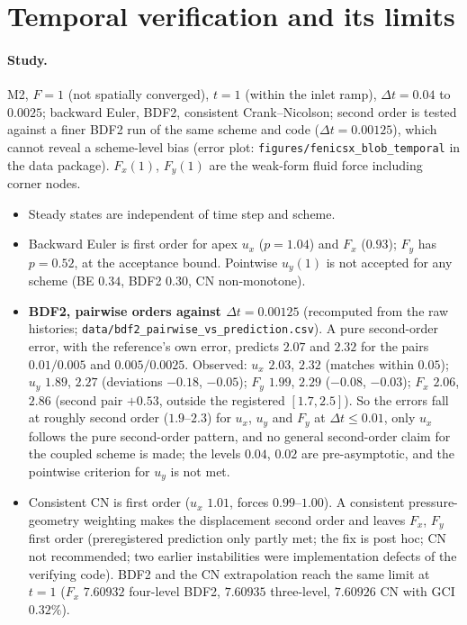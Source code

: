 \documentclass[sn-mathphys,Numbered]{sn-jnl}
\begin{document}
\section{Temporal verification and its limits}\label{sec:fx_time}
\paragraph{Study.}
M2, $F=1$ (not spatially converged), $t=1$ (within the inlet ramp), $\Delta t=0.04$ to $0.0025$; backward Euler, BDF2, consistent Crank--Nicolson; second order is tested against a finer BDF2 run of the same scheme and code ($\Delta t=0.00125$), which cannot reveal a scheme-level bias (error plot: \texttt{figures/fenicsx\_blob\_temporal} in the data package).
$F_x(1)$, $F_y(1)$ are the weak-form fluid force including corner nodes.
\begin{itemize}
\item Steady states are independent of time step and scheme.
\item Backward Euler is first order for apex $u_x$ ($p=1.04$) and $F_x$ ($0.93$); $F_y$ has $p=0.52$, at the acceptance bound. Pointwise $u_y(1)$ is not accepted for any scheme (BE $0.34$, BDF2 $0.30$, CN non-monotone).
\item \textbf{BDF2, pairwise orders against $\Delta t=0.00125$} (recomputed from the raw histories; \texttt{data/bdf2\_pairwise\_vs\_prediction.csv}). A pure second-order error, with the reference's own error, predicts $2.07$ and $2.32$ for the pairs $0.01/0.005$ and $0.005/0.0025$. Observed: $u_x$ $2.03$, $2.32$ (matches within $0.05$); $u_y$ $1.89$, $2.27$ (deviations $-0.18$, $-0.05$); $F_y$ $1.99$, $2.29$ ($-0.08$, $-0.03$); $F_x$ $2.06$, $2.86$ (second pair $+0.53$, outside the registered $[1.7,2.5]$). So the errors fall at roughly second order ($1.9$--$2.3$) for $u_x$, $u_y$ and $F_y$ at $\Delta t\le0.01$, only $u_x$ follows the pure second-order pattern, and no general second-order claim for the coupled scheme is made; the levels $0.04$, $0.02$ are pre-asymptotic, and the pointwise criterion for $u_y$ is not met.
\item Consistent CN is first order ($u_x$ $1.01$, forces $0.99$--$1.00$). A consistent pressure-geometry weighting makes the displacement second order and leaves $F_x$, $F_y$ first order (preregistered prediction only partly met; the fix is post hoc; CN not recommended; two earlier instabilities were implementation defects of the verifying code). BDF2 and the CN extrapolation reach the same limit at $t=1$ ($F_x$ $7.60932$ four-level BDF2, $7.60935$ three-level, $7.60926$ CN with GCI $0.32\%$).

\end{itemize}
\end{document}
